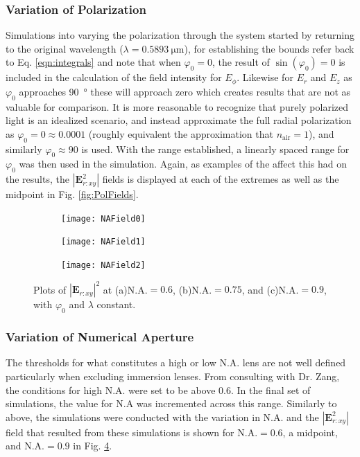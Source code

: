 \documentclass[12pt,a4paper]{article}
\begin{document}
\subsubsection{Variation of Polarization}
\label{AdjPol}
Simulations into varying the polarization through the system started by returning to the original wavelength ($\lambda = \SI{0.5893}{\micro\meter}$), for establishing the bounds refer back to Eq. \ref{eqn:integrals} and note that when $\varphi_0 = 0$, the result of $\sin(\varphi_0)=0$ is included in the calculation of the field intensity for $E_\phi$. Likewise for $E_r$ and $E_z$ as $\varphi_0$ approaches \SI{90}{\degree} these will approach zero which creates results that are not as valuable for comparison. It is more reasonable to recognize that purely polarized light is an idealized scenario, and instead approximate the full radial polarization as $\varphi_0 = 0 \approx 0.0001$ (roughly equivalent the approximation that $n_\text{air}=1$), and similarly $\varphi_0 \approx 90$ is used. With the range established, a linearly spaced range for $\varphi_0$ was then used in the simulation. Again, as examples of the affect this had on the results, the  $|\textbf{E}^2_{r:xy}|$ fields is displayed at each of the extremes as well as the midpoint in Fig. \ref{fig:PolFields}.

\begin{figure}[htp]
     \centering
     \begin{subfigure}[b]{0.32\textwidth}
         \centering
         \texttt{[image: NAField0]}
         \caption{}
         \label{fig:NAField0}
     \end{subfigure}
     \hfill
     \begin{subfigure}[b]{0.32\textwidth}
         \centering
         \texttt{[image: NAField1]}
         \caption{}
         \label{fig:NAField1}
     \end{subfigure}
     \hfill
     \begin{subfigure}[b]{0.32\textwidth}
         \centering
         \texttt{[image: NAField2]}
         \caption{}
         \label{fig:NAField2}
     \end{subfigure}
        \caption{Plots of $|\textbf{E}_{r:xy}|^2$ at (a)N.A.$ = 0.6$, (b)N.A.$ = 0.75$, and (c)N.A.$ = 0.9$, with $\varphi_0$ and $\lambda$ constant.}
        \label{fig:NAFields}
\end{figure}

\subsubsection{Variation of Numerical Aperture}
The thresholds for what constitutes a high or low N.A. lens are not well defined particularly when excluding immersion lenses. From consulting with Dr. Zang, the conditions for high N.A. were set to be above 0.6. In the final set of simulations, the value for N.A was incremented across this range. Similarly to above, the simulations were conducted with the variation in N.A. and the $|\textbf{E}^2_{r:xy}|$ field that resulted from these simulations is shown for N.A.$ = 0.6$, a midpoint, and N.A.$ = 0.9$ in Fig. \ref{fig:NAFields}.
\end{document}
